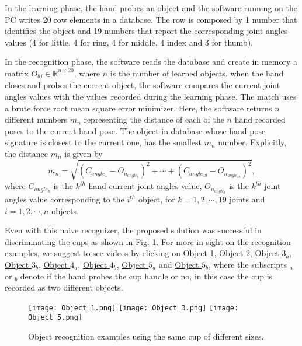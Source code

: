 In the learning phase, the hand probes an object and the software running on the PC writes 20 row elements in a database. The row is composed by 1 number that identifies the object and 19 numbers that report the corresponding joint angles values (4 for little, 4 for ring, 4 for middle, 4 index and 3 for thumb).

In the recognition phase, the software reads the database and create in memory a matrix $O_{bj} \in \mathbb{R}^{n \times 20}$, where $n$ is the number of learned objects. when the hand closes and probes the current object, the software compares the current joint angles values with the values recorded during the learning phase. The match uses a brute force root mean square error minimizer. Here, the software returns $n$ different numbers $m_n$ representing the distance of each of the $n$ hand recorded poses to the current hand pose. The object in database whose hand pose signature is closest to the current one, has the smallest $m_n$ number. Explicitly, the distance $m_n$ is given by
\begin{equation}
m_n = \sqrt{(C_{angle_{1}} - O_{n_{angle_{1}}})^2 + \cdots + (C_{angle_{19}} - O_{n_{angle_{19}}})^2 },
\end{equation}
where $C_{angle_{k}}$ is the $k^{th}$ hand current joint angles value, $O_{n_{angle_{k}}}$ is the $k^{th}$ joint angles value corresponding to the $i^{th}$ object, for $k=1, 2 , \cdots , 19$ joints and $i=1,2, \cdots, n$ objects.


Even with this naive recognizer, the proposed solution was successful in discriminating the cups as shown in Fig. \ref{fig:Object_1}. For more in-sight on the recognition examples, we suggest to see videos by clicking on \href{https://www.youtube.com/watch?v=d_WPQ3WmHRg}{Object 1}, \href{https://www.youtube.com/watch?v=PG38VObdl6o}{Object 2}, \href{https://www.youtube.com/watch?v=bIYhLXm90hc}{Object $3_a$}, \href{https://www.youtube.com/watch?v=IXVlBAoGKho}{Object $3_b$}, \href{https://www.youtube.com/watch?v=Efmm6-JHcxU}{Object $4_a$}, \href{https://www.youtube.com/watch?v=NZElSV_AnJ4}{Object $4_b$}, \href{https://www.youtube.com/watch?v=mDDb5oTaHzM}{Object $5_a$} and \href{https://www.youtube.com/watch?v=sLzU39zffFY}{Object $5_b$}, where the subscripts $_a$ or $_b$ denote if the hand probes the cup handle or no, in this case the cup is recorded as two different objects.

\begin{figure}[h]
\centering
\texttt{[image: Object\_1.png]}
\texttt{[image: Object\_3.png]}
\texttt{[image: Object\_5.png]}
\caption{Object recognition examples using the same cup of different sizes.}
\label{fig:Object_1}
\end{figure}